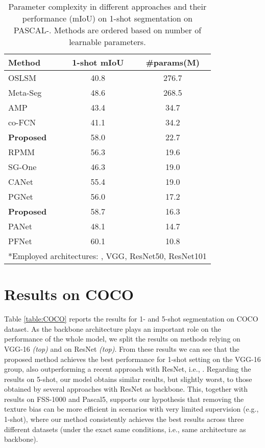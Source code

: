 \documentclass[runningheads]{llncs}
\begin{document}
\begin{table}[h!]
\centering
\caption{Parameter complexity in different approaches and their performance (mIoU) on 1-shot segmentation on PASCAL-. Methods are ordered based on number of learnable parameters.}
\begin{tabular}{l | c | c}
\toprule
\bf Method & \bf 1-shot mIoU & \bf \#params(M) \\ [0.2ex]
\midrule
OSLSM \cite{shaban2017one} & 40.8 & 276.7 \\
Meta-Seg \cite{cao2019meta} & 48.6 & 268.5 \\
AMP \cite{siam2019amp} & 43.4 & 34.7 \\
co-FCN \cite{rakelly2018conditional} & 41.1 & 34.2\\
\bf Proposed & 58.0 & 22.7 \\
RPMM \cite{yang2020prototype} & 56.3 &  19.6 \\
SG-One \cite{zhang2018sg} & 46.3 & 19.0 \\
CANet \cite{zhang2019canet} & 55.4 & 19.0 \\
PGNet \cite{zhang2019pyramid} & 56.0 & 17.2 \\
\bf Proposed & 58.7 & 16.3 \\
PANet \cite{wang2019panet} & 48.1 & 14.7 \\
PFNet \cite{tian2020prior} & 60.1 & 10.8 \\
\hline
\multicolumn{3}{l}{\scriptsize{*Employed architectures: , VGG,  ResNet50,  ResNet101}}\\
\end{tabular}
    \label{tab:complexity}
\end{table}

\section{Results on COCO}

Table \ref{table:COCO} reports the results for 1- and 5-shot segmentation on COCO dataset. As the backbone architecture plays an important role on the performance of the whole model, we split the results on methods relying on VGG-16 \textit{(top)} and on ResNet \textit{(top)}. From these results we can see that the proposed method achieves the best performance for 1-shot setting on the VGG-16 group, also outperforming a recent approach with ResNet, i.e., \cite{nguyen2019feature}. Regarding the results on 5-shot, our model obtains similar results, but slightly worst, to those obtained by several approaches with ResNet as backbone. This, together with results on FSS-1000 and Pascal5, supports our hypothesis that removing the texture bias can be more efficient in scenarios with very limited supervision (e.g., 1-shot), where our method consistently achieves the best results across three different datasets (under the exact same conditions, i.e., same architecture as backbone).
\end{document}

